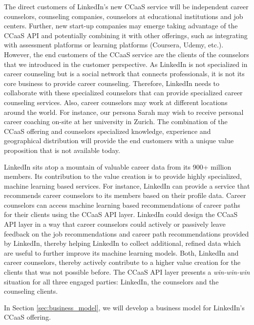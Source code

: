 The direct customers of LinkedIn's new CCaaS service will be independent career counselors, counseling companies, 
counselors at educational institutions and job centers. Further, new start-up companies may emerge taking advantage
of the CCaaS API and potentially combining it with other offerings, such as integrating with assessment platforms 
or learning platforms (Coursera, Udemy, etc.). However, the end customers of the CCaaS service are the clients of
the counselors that we introduced in the customer perspective. As LinkedIn is not specialized in career counseling
but is a social network that connects professionals, it is not its core business to provide career counseling.
Therefore, LinkedIn needs to collaborate with these specialized counselors that can provide specialized career
counseling services. Also, career counselors may work at different locations around the world. For instance, our
persona Sarah may wish to receive personal career coaching on-site at her university in Zurich. The combination of
the CCaaS offering and counselors specialized knowledge, experience and geographical distribution will provide
the end customers with a unique value proposition that is not available today.

LinkedIn sits atop a mountain of valuable career data from its 900+ million members. Its contribution to the value 
creation is to provide highly specialized, machine learning based services. For instance, LinkedIn can provide a
service that recommends career counselors to its members based on their profile data. Career counselors can access
machine learning based recommendations of career paths for their clients using the CCaaS API layer. LinkedIn could
design the CCaaS API layer in a way that career counselors could actively or passively leave feedback on the job
recommendations and career path recommendations provided by LinkedIn, thereby helping LinkedIn to collect additional,
refined data which are useful to further improve its machine learning models. Both, LinkedIn and career counselors,
thereby actively contribute to a higher value creation for the clients that was not possible before. The CCaaS API
layer presents a \textit{win-win-win} situation for all three engaged parties: LinkedIn, the counselors and the
counseling clients.
\newline

\noindent In Section \ref{sec:business_model}, we will develop a business model for LinkedIn's CCaaS offering.